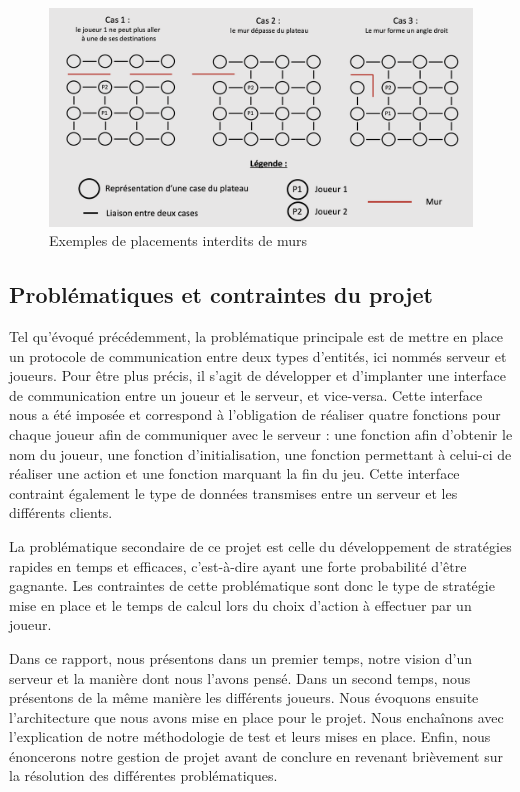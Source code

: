 \documentclass[11pt]{article}
\begin{document}
\begin{figure}[H]
    \centering
    \includegraphics[width=\linewidth]{incorrect_wall.png}
    \caption{Exemples de placements interdits de murs}
    \label{fig:incorrect_wall}
\end{figure}

\subsection{Problématiques et contraintes du projet}

Tel qu'évoqué précédemment, la problématique principale est de mettre en place un protocole de communication entre deux types d'entités, ici nommés serveur et joueurs. Pour être plus précis, il s'agit de développer et d'implanter une interface de communication entre un joueur et le serveur, et vice-versa. Cette interface nous a été imposée et correspond à l'obligation de réaliser quatre fonctions pour chaque joueur afin de communiquer avec le serveur : une fonction afin d'obtenir le nom du joueur, une fonction d'initialisation, une fonction permettant à celui-ci de réaliser une action et une fonction marquant la fin du jeu. Cette interface contraint également le type de données transmises entre un serveur et les différents clients.

La problématique secondaire de ce projet est celle du développement de stratégies rapides en temps et efficaces, c'est-à-dire ayant une forte probabilité d'être gagnante. Les contraintes de cette problématique sont donc le type de stratégie mise en place et le temps de calcul lors du choix d'action à effectuer par un joueur.

\vspace{4mm}

Dans ce rapport, nous présentons dans un premier temps, notre vision d'un serveur et la manière dont nous l'avons pensé. Dans un second temps, nous présentons de la même manière les différents joueurs.
Nous évoquons ensuite l'architecture que nous avons mise en place pour le projet. Nous enchaînons avec l'explication de notre méthodologie de test et leurs mises en place. Enfin, nous énoncerons notre gestion de projet avant de conclure en revenant brièvement sur la résolution des différentes problématiques.
\end{document}
